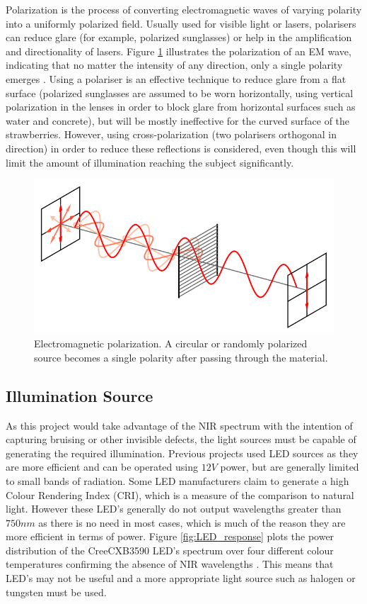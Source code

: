 \documentclass[fleqn,twoside,12pt]{report}
\begin{document}
Polarization is the process of converting electromagnetic waves of varying polarity into a uniformly polarized field. Usually used for visible light or lasers, polarisers can reduce glare (for example, polarized sunglasses) or help in the amplification and directionality of lasers. Figure \ref{fig:polarization} illustrates the polarization of an EM wave, indicating that no matter the intensity of any direction, only a single polarity emerges  \cite{physicsopenlab}. Using a polariser is an effective technique to reduce glare from a flat surface (polarized sunglasses are assumed to be worn horizontally, using vertical polarization in the lenses in order to block glare from horizontal surfaces such as water and concrete), but will be mostly ineffective for the curved surface of the strawberries. However, using cross-polarization (two polarisers orthogonal in direction) in order to reduce these reflections is considered, even though this will limit the amount of illumination reaching the subject significantly.

\begin{figure}[h]
	\centering
	\includegraphics[width=.8\linewidth]{polarization.png}
	\caption{Electromagnetic polarization. A circular or randomly polarized source becomes a single polarity after passing through the material.}
	\label{fig:polarization}
\end{figure}%


\subsection{Illumination Source}

As this project would take advantage of the NIR spectrum with the intention of capturing bruising or other invisible defects, the light sources must be capable of generating the required illumination. Previous projects used LED sources as they are more efficient and can be operated using $12V$ power, but are generally limited to small bands of radiation. Some LED manufacturers claim to generate a high Colour Rendering Index (CRI), which is a measure of the comparison to natural light. However these LED's generally do not output wavelengths greater than $750nm$ as there is no need in most cases, which is much of the reason they are more efficient in terms of power. Figure \ref{fig:LED_response} plots the power distribution of the Cree\textregistered CXB3590 LED's spectrum over four different colour temperatures confirming the absence of NIR wavelengths \cite{led_power}. This means that LED's may not be useful and a more appropriate light source such as halogen or tungsten must be used.
\end{document}
